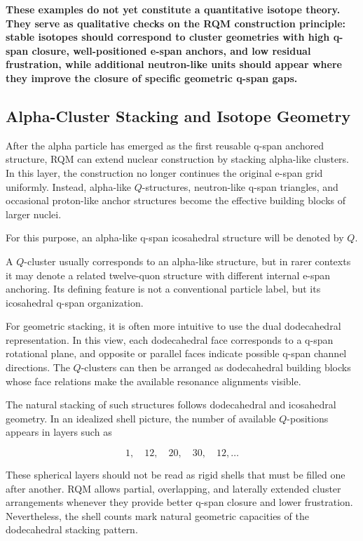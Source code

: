 \documentclass[11pt,a4paper]{article}
\begin{document}
\textbf{These examples do not yet constitute a quantitative isotope theory. They serve as qualitative checks on the RQM construction principle: stable isotopes should correspond to cluster geometries with high q-span closure, well-positioned e-span anchors, and low residual frustration, while additional neutron-like units should appear where they improve the closure of specific geometric q-span gaps.}



\subsection{Alpha-Cluster Stacking and Isotope Geometry}

After the alpha particle has emerged as the first reusable q-span anchored structure, RQM can extend nuclear construction by stacking alpha-like clusters. In this layer, the construction no longer continues the original e-span grid uniformly. Instead, alpha-like \(Q\)-structures, neutron-like q-span triangles, and occasional proton-like anchor structures become the effective building blocks of larger nuclei.

For this purpose, an alpha-like q-span icosahedral structure will be denoted by \(Q\).

A \(Q\)-cluster usually corresponds to an alpha-like structure, but in rarer contexts it may denote a related twelve-quon structure with different internal e-span anchoring. Its defining feature is not a conventional particle label, but its icosahedral q-span organization.

For geometric stacking, it is often more intuitive to use the dual dodecahedral representation. In this view, each dodecahedral face corresponds to a q-span rotational plane, and opposite or parallel faces indicate possible q-span channel directions. The \(Q\)-clusters can then be arranged as dodecahedral building blocks whose face relations make the available resonance alignments visible.

The natural stacking of such structures follows dodecahedral and icosahedral geometry. In an idealized shell picture, the number of available \(Q\)-positions appears in layers such as

\[
1,\quad 12,\quad 20,\quad 30,\quad 12,\ldots
\]

These spherical layers should not be read as rigid shells that must be filled one after another. RQM allows partial, overlapping, and laterally extended cluster arrangements whenever they provide better q-span closure and lower frustration. Nevertheless, the shell counts mark natural geometric capacities of the dodecahedral stacking pattern.
\end{document}
